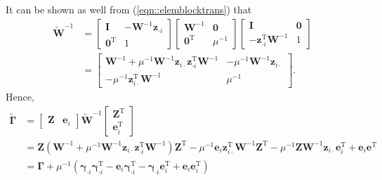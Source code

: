 \documentclass{article}
\begin{document}
\begin{appendices}
    It can be shown as well from (\ref{eqn::elemblocktrans}) that 
    \begin{equation}\begin{aligned}
      \widetilde{\mathbf{W}}^{-1} &= \begin{bmatrix}
      \mathbf{I} & -\mathbf{W}^{-1}{\boldsymbol{z}}_{\cdot i}  \\ \boldsymbol{0}^\mathrm{T} & 1
    \end{bmatrix}\begin{bmatrix}
      \mathbf{W}^{-1} & \boldsymbol{0} \\ {\boldsymbol{0}}^{\mathrm{T}} & \mu^{-1}
    \end{bmatrix}\begin{bmatrix}
      \mathbf{I} & \boldsymbol{0} \\ -{\boldsymbol{z}}_{\cdot i}^{\mathrm{T}} \mathbf{W}^{-1} & 1
    \end{bmatrix} \\
    &= \begin{bmatrix}
      \mathbf{W}^{-1} + \mu^{-1}\mathbf{W}^{-1}\boldsymbol{z}_{i \cdot}{\boldsymbol{z}}_{\cdot i}^{\mathrm{T}}\mathbf{W}^{-1} & -\mu^{-1}\mathbf{W}^{-1}\boldsymbol{z}_{i \cdot} \\
      -\mu^{-1}\boldsymbol{z}_{i \cdot}^\mathrm{T}\mathbf{W}^{-1} & \mu^{-1}
    \end{bmatrix}.
    \end{aligned}\end{equation}
    Hence, \begin{equation}
    \begin{aligned}
      \widetilde{\mathbf{\Gamma}} &= \begin{bmatrix}
        \mathbf{Z} & \boldsymbol{e}_i
      \end{bmatrix}\widetilde{\mathbf{W}}^{-1}\begin{bmatrix}
        {\mathbf{Z}}^{\mathrm{T}} \\ {\boldsymbol{e}}_i^{\mathrm{T}}
      \end{bmatrix} \\
      &= \mathbf{Z}(\mathbf{W}^{-1} + \mu^{-1}\mathbf{W}^{-1}\boldsymbol{z}_{i \cdot}{\boldsymbol{z}}_{\cdot i}^{\mathrm{T}}\mathbf{W}^{-1}){\mathbf{Z}}^{\mathrm{T}} - \mu^{-1}\boldsymbol{e}_i \boldsymbol{z}_{i \cdot}^\mathrm{T}\mathbf{W}^{-1}{\mathbf{Z}}^{\mathrm{T}} - \mu^{-1}\mathbf{Z}\mathbf{W}^{-1}\boldsymbol{z}_{i \cdot}\boldsymbol{e}_i^\mathrm{T} + \boldsymbol{e}_i {\boldsymbol{e}}^{\mathrm{T}} \\
      &= \mathbf{\Gamma} + \mu^{-1}(\boldsymbol{\gamma}_{\cdot i}\boldsymbol{\gamma}_{\cdot i}^\mathrm{T} - \boldsymbol{e}_i\boldsymbol{\gamma}_{\cdot i}^\mathrm{T} - \boldsymbol{\gamma}_{\cdot i}{\boldsymbol{e}}_i^{\mathrm{T}} + \boldsymbol{e}_i {\boldsymbol{e}}_i^{\mathrm{T}}) \\

\end{aligned}
\end{equation}
\end{appendices}
\end{document}
